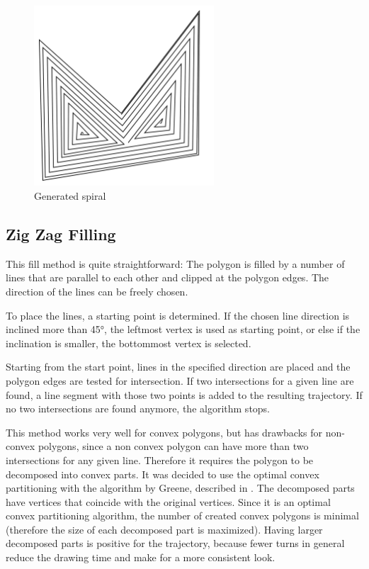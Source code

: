 \begin{figure}
\centering
\includegraphics[width=0.6\textwidth]{images/algorithms/spiral_fill/spiral_real.pdf}
\caption{Generated spiral} \label{fig:gen_spiral}
\end{figure}

\clearpage

\subsection{Zig Zag Filling}

This fill method is quite straightforward: The polygon is filled by a number of lines that are parallel to each other and clipped at the polygon edges. The direction of the lines can be freely chosen.

To place the lines, a starting point is determined. If the chosen line direction is inclined more than 45°, the leftmost vertex is used as starting point, or else if the inclination is smaller, the bottommost vertex is selected.

Starting from the start point, lines in the specified direction are placed and the polygon edges are tested for intersection. If two intersections for a given line are found, a line segment with those two points is added to the resulting trajectory. If no two intersections are found anymore, the algorithm stops.

This method works very well for convex polygons, but has drawbacks for non-convex polygons, since a non convex polygon can have more than two intersections for any given line. Therefore it requires the polygon to be decomposed into convex parts. It was decided to use the optimal convex partitioning with the algorithm by Greene, described in \cite{greene1983decomposition}. The decomposed parts have vertices that coincide with the original vertices. Since it is an optimal convex partitioning algorithm, the number of created convex polygons is minimal (therefore the size of each decomposed part is maximized). Having larger decomposed parts is positive for the trajectory, because fewer turns in general reduce the drawing time and make for a more consistent look.

